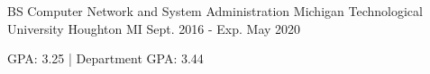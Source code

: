 

\begin{cventries}

  \cventry
    {BS Computer Network and System Administration} %
    {Michigan Technological University} %
    {Houghton MI} %
    {Sept. 2016 - Exp. May 2020} %
    {
      \begin{cvitems} %
        \item {GPA: 3.25  |  Department GPA: 3.44}
      \end{cvitems}
    }

\end{cventries}
